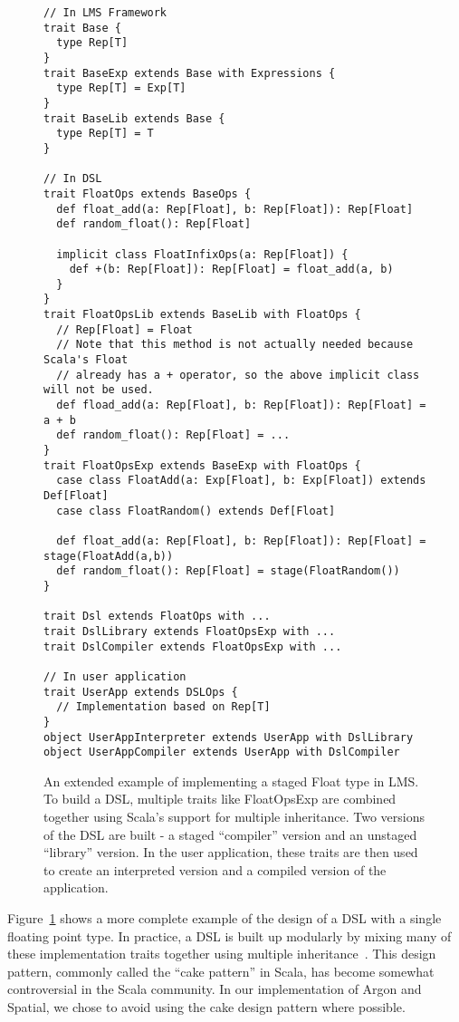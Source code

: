 \begin{figure}
\begin{lstlisting}[language=ScalaDSL]
// In LMS Framework
trait Base {
  type Rep[T]
}
trait BaseExp extends Base with Expressions {
  type Rep[T] = Exp[T]
}
trait BaseLib extends Base {
  type Rep[T] = T
}

// In DSL
trait FloatOps extends BaseOps {
  def float_add(a: Rep[Float], b: Rep[Float]): Rep[Float]
  def random_float(): Rep[Float]

  implicit class FloatInfixOps(a: Rep[Float]) {
    def +(b: Rep[Float]): Rep[Float] = float_add(a, b)
  }
}
trait FloatOpsLib extends BaseLib with FloatOps {
  // Rep[Float] = Float
  // Note that this method is not actually needed because Scala's Float
  // already has a + operator, so the above implicit class will not be used.
  def fload_add(a: Rep[Float], b: Rep[Float]): Rep[Float] = a + b
  def random_float(): Rep[Float] = ...
}
trait FloatOpsExp extends BaseExp with FloatOps {
  case class FloatAdd(a: Exp[Float], b: Exp[Float]) extends Def[Float]
  case class FloatRandom() extends Def[Float]

  def float_add(a: Rep[Float], b: Rep[Float]): Rep[Float] = stage(FloatAdd(a,b))
  def random_float(): Rep[Float] = stage(FloatRandom())
}

trait Dsl extends FloatOps with ...
trait DslLibrary extends FloatOpsExp with ...
trait DslCompiler extends FloatOpsExp with ...

// In user application
trait UserApp extends DSLOps {
  // Implementation based on Rep[T]
}
object UserAppInterpreter extends UserApp with DslLibrary
object UserAppCompiler extends UserApp with DslCompiler
\end{lstlisting}
\caption{An extended example of implementing a staged Float type in LMS.
To build a DSL, multiple traits like FloatOpsExp are combined together
using Scala's support for multiple inheritance. Two versions of the DSL are
built - a staged ``compiler'' version and an unstaged ``library'' version.
In the user application, these traits are then used to create an
interpreted version and a compiled version of the application.}
\label{fig:lms-dsl-example}
\end{figure}

Figure~\ref{fig:lms-dsl-example} shows a more complete example of the design
of a DSL with a single floating point type. In practice, a
DSL is built up modularly by mixing many of these implementation traits together
using multiple inheritance~\cite{cake-pattern}.
This design pattern, commonly called the ``cake pattern'' in Scala, has
become somewhat controversial in the Scala community. In our implementation
of Argon and Spatial, we chose to avoid using the cake design pattern where possible.


